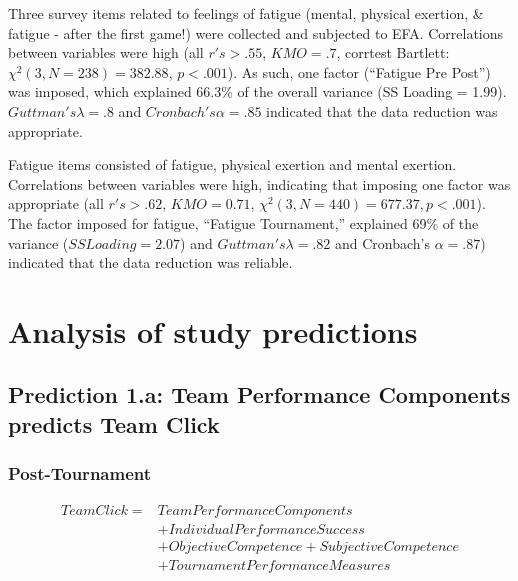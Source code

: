 Three survey items related to feelings of fatigue (mental, physical exertion, & fatigue - after the first game!)  were collected and subjected to EFA.
Correlations between variables were high (all $r's > .55$, $KMO = .7$, corrtest Bartlett: $\chi^2(3, N = 238) = 382.88$, $p < .001$).  As such, one factor (``Fatigue Pre Post'') was imposed, which explained 66.3\% of the overall variance (SS Loading = 1.99).  $Guttman's \lambda =.8$ and $Cronbach's \alpha = .85$ indicated that the data reduction was appropriate.

Fatigue items consisted of fatigue, physical exertion and mental exertion. Correlations between variables were high, indicating that imposing one factor was appropriate (all $r's > .62$, $KMO = 0.71$, $\chi^2(3, N = 440) =  677.37, p < .001$).  The factor imposed for fatigue, ``Fatigue Tournament,'' explained 69\% of the variance ($SS Loading = 2.07$) and $Guttman's \lambda =.82$ and Cronbach's $\alpha = .87$) indicated that the data reduction was reliable.






























 \section{Analysis of study predictions\label{app8:analysisPredictions}}




 \subsection{Prediction 1.a: Team Performance Components predicts Team Click}


 \subsubsection{Post-Tournament}

 \begin{equation}
   \begin{align*}
     Team Click =  & Team Performance Components\\
               & + Individual Performance Success \\
               & + Objective Competence + Subjective Competence\\
               & + TournamentPerformanceMeasures \\
   \end{align*}
 \end{equation}
 \bigskip


